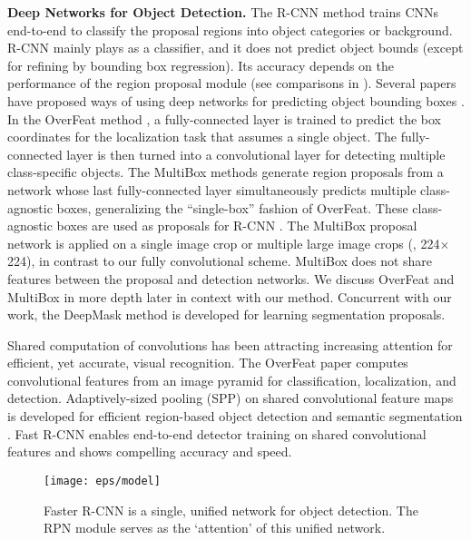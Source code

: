 \documentclass[10pt,journal,cspaper,compsoc]{IEEEtran}
\begin{document}
\vspace{.5em}
\noindent\textbf{Deep Networks for Object Detection.} The R-CNN method \cite{Girshick2014} trains CNNs end-to-end to classify the proposal regions into object categories or background. R-CNN mainly plays as a classifier, and it does not  predict object bounds (except for refining by bounding box regression).
Its accuracy depends on the performance of the region proposal module (see comparisons in \cite{Hosang2015}).
Several papers have proposed ways of using deep networks for predicting object bounding boxes \cite{Szegedy2013,Sermanet2014,Erhan2014,Szegedy2014a}.
In the OverFeat method \cite{Sermanet2014}, a fully-connected layer is trained to predict the box coordinates for the localization task that assumes a single object. The fully-connected layer is then turned into a convolutional layer for detecting multiple class-specific objects. The MultiBox methods \cite{Erhan2014,Szegedy2014a} generate region proposals from a network whose last fully-connected layer simultaneously predicts multiple class-agnostic boxes, generalizing the ``single-box'' fashion of OverFeat. These class-agnostic boxes are used as proposals for R-CNN \cite{Girshick2014}.
The MultiBox proposal network is applied on a single image crop or multiple large image crops (\eg, 224$\times$224), in contrast to our fully convolutional scheme. MultiBox does not share features between the proposal and detection networks.
We discuss OverFeat and MultiBox in more depth later in context with our method.
Concurrent with our work, the DeepMask method \cite{Pinheiro2015} is developed for learning segmentation proposals.

Shared computation of convolutions \cite{Sermanet2014,He2014,Dai2015,Long2015,Girshick2015a} has been attracting increasing attention for efficient, yet accurate, visual recognition. The OverFeat paper \cite{Sermanet2014} computes convolutional features from an image pyramid for classification, localization, and detection. Adaptively-sized pooling (SPP) \cite{He2014} on shared convolutional feature maps is developed for efficient region-based object detection \cite{He2014,Ren2015} and semantic segmentation \cite{Dai2015}. Fast R-CNN \cite{Girshick2015a} enables end-to-end detector training on shared convolutional features and shows compelling accuracy and speed.

\begin{figure}[t]
\centering
\texttt{[image: eps/model]}
\caption{Faster R-CNN is a single, unified network for object detection. The RPN module serves as the `attention' of this unified network.}
\label{fig:model}
\end{figure}
\end{document}
